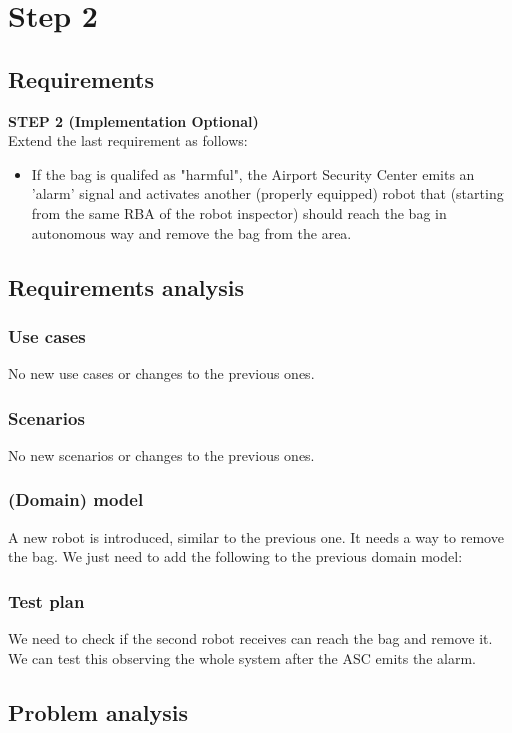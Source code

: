 \documentclass{llncs}
\begin{document}
\section{Step 2}
\subsection{Requirements}
\textbf{STEP 2 (Implementation Optional)}\\
Extend the last requirement as follows:
\begin{itemize}
\item If the bag is qualifed as "harmful", the Airport Security Center emits an 'alarm' signal and activates another (properly equipped) robot that (starting from the same RBA of the robot inspector) should reach the bag in autonomous way and remove the bag from the area.
\end{itemize}
\subsection{Requirements analysis}
\subsubsection{Use cases}
No new use cases or changes to the previous ones.
\subsubsection{Scenarios}
No new scenarios or changes to the previous ones.
\subsubsection{(Domain) model}
A new robot is introduced, similar to the previous one. It needs a way to remove the bag. We just need to add the following to the previous domain model:

\subsubsection{Test plan}
We need to check if the second robot receives can reach the bag and remove it. We can test this observing the whole system after the ASC emits the alarm.
\subsection{Problem analysis}
\end{document}
